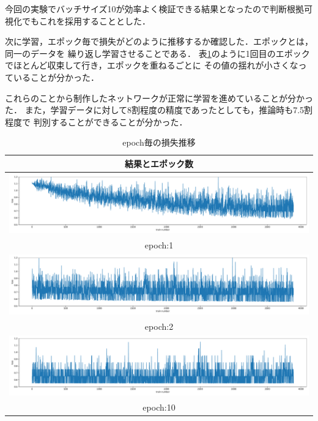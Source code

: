 今回の実験でバッチサイズ10が効率よく検証できる結果となったので判断根拠可視化でもこれを採用することとした．

次に学習，エポック毎で損失がどのように推移するか確認した．エポックとは，同一のデータを
繰り返し学習させることである．
表\ref{epoch}のように1回目のエポックでほとんど収束して行き，エポックを重ねるごとに
その値の揺れが小さくなっていることが分かった．

これらのことから制作したネットワークが正常に学習を進めていることが分かった．
また，学習データに対して8割程度の精度であったとしても，推論時も7.5割程度で
判別することができることが分かった．

\begin{table}[b]
  \begin{center}
    \begin{tabular}{|c|} \hline
      結果とエポック数 \\ \hline
        \includegraphics[width=130mm]{images/net_result/epoch_1.pdf} \\ epoch:1 \\ \hline
        \includegraphics[width=130mm]{images/net_result/epoch_2.pdf} \\ epoch:2 \\ \hline
        \includegraphics[width=130mm]{images/net_result/epoch_10.pdf} \\ epoch:10 \\ \hline
    \end{tabular}
  \end{center}
  \caption{epoch毎の損失推移}
  \label{epoch}
\end{table}
\clearpage